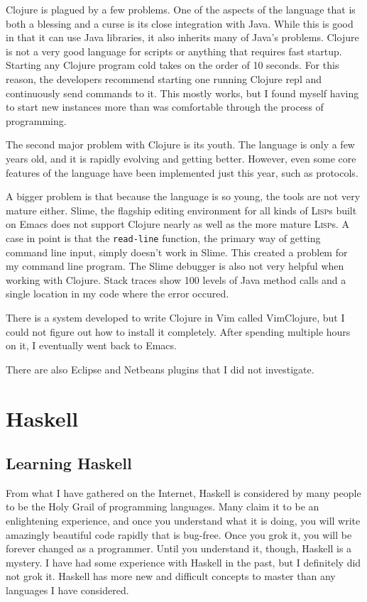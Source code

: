 \documentclass{article}
\begin{document}
Clojure is plagued by a few problems.  One of the aspects of the language that
is both a blessing and a curse is its close integration with Java.  While this
is good in that it can use Java libraries, it also inherits many of Java's
problems.  Clojure is not a very good language for scripts or anything that
requires fast startup.  Starting any Clojure program cold takes on the order of
10 seconds.  For this reason, the developers recommend starting one running
Clojure repl and continuously send commands to it.  This mostly works, but I
found myself having to start new instances more than was comfortable through the
process of programming.

The second major problem with Clojure is its youth.  The language is only
a few years old, and it is rapidly evolving and getting better.  However, even
some core features of the language have been implemented just this year, such as
protocols.

A bigger problem is that because the language is so young, the tools are not
very mature either.  Slime, the flagship editing environment for all kinds of
\textsc{Lisp}s built on Emacs does not support Clojure nearly as well as the more mature
\textsc{Lisp}s.  A case in point is that the \texttt{read-line} function, the primary way of
getting command line input, simply doesn't work in Slime.  This created a
problem for my command line program.  The Slime debugger is also not very
helpful when working with Clojure.  Stack traces show 100 levels of Java
method calls and a single location in my code where the error occured.

There is a system developed to write Clojure in Vim called VimClojure, but I
could not figure out how to install it completely.  After spending multiple
hours on it, I eventually went back to Emacs.

There are also Eclipse and Netbeans plugins that I did not investigate.

\section{Haskell}

\subsection{Learning Haskell}

From what I have gathered on the Internet, Haskell is considered by many people
to be the Holy Grail of programming languages.  Many claim it to be an
enlightening experience, and once you understand what it is doing, you will
write amazingly beautiful code rapidly that is bug-free.  Once you grok it, you
will be forever changed as a programmer.  Until you understand it, though,
Haskell is a mystery.  I have had some experience with Haskell in the past, but
I definitely did not grok it.  Haskell has more new and difficult concepts to
master than any languages I have considered.
\end{document}
